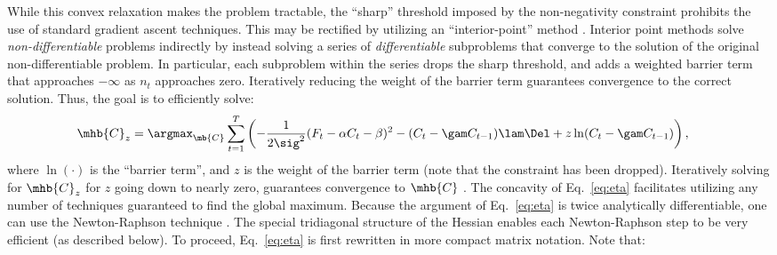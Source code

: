While this convex relaxation makes the problem tractable, the ``sharp'' threshold imposed by the non-negativity constraint prohibits the use of standard gradient ascent techniques. This may be rectified by utilizing an ``interior-point'' method  \cite{CONV04}.  Interior point methods solve \emph{non-differentiable} problems indirectly by instead solving a series of \emph{differentiable} subproblems that converge to the solution of the original non-differentiable problem.  In particular, each subproblem within the series drops the sharp threshold, and adds a weighted barrier term that approaches $-\infty$ as $n_t$ approaches zero. Iteratively reducing the weight of the barrier term guarantees convergence to the correct solution.  Thus, the goal is to efficiently solve:
\begin{align} \label{eq:eta}
\mhb{C}_{\zzz} &= \argmax_{\mb{C}}  \sum_{t=1}^T \left( -\frac{1}{2 \sig^2}(F_t - \alpha C_t - \beta)^2  -  (C_t-\gam C_{t-1})  \lam \Del + \zzz \ln (C_t-\gam C_{t-1}) \right),
\end{align}
\noindent where $\ln (\cdot)$ is the ``barrier term'', and $z$ is the weight of the barrier term (note that the constraint has been dropped).  Iteratively solving for $\mhb{C}_{\zzz}$ for $z$ going down to nearly zero, guarantees convergence to $\mhb{C}$ \cite{CONV04}. %
The concavity of Eq.~\eqref{eq:eta} facilitates utilizing any number of techniques guaranteed to find the global maximum.  Because the argument of Eq.~\eqref{eq:eta} is twice analytically differentiable, one can use the Newton-Raphson technique \cite{Press92}. The special tridiagonal structure of the Hessian enables each Newton-Raphson step to be very efficient (as described below).  To proceed, Eq.~\eqref{eq:eta} is first rewritten in more compact matrix notation.  Note that:
